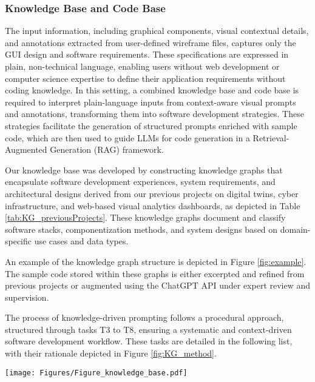 \begin{description}
\subsubsection{Knowledge Base and Code Base}
\label{subsec:KB_CB}
The input information, including graphical components, visual contextual details, and annotations extracted from user-defined wireframe files, captures only the GUI design and software requirements. These specifications are expressed in plain, non-technical language, enabling users without web development or computer science expertise to define their application requirements without coding knowledge. In this setting, a combined knowledge base and code base is required to interpret plain-language inputs from context-aware visual prompts and annotations, transforming them into software development strategies. These strategies facilitate the generation of structured prompts enriched with sample code, which are then used to guide LLMs for code generation in a Retrieval-Augmented Generation (RAG) framework. 

Our knowledge base was developed by constructing knowledge graphs that encapsulate software development experiences, system requirements, and architectural designs derived from our previous projects on digital twins, cyber infrastructure, and web-based visual analytics dashboards, as depicted in Table \ref{tab:KG_previousProjects}. These knowledge graphs document and classify software stacks, componentization methods, and system designs based on domain-specific use cases and data types. 



An example of the knowledge graph structure is depicted in Figure \ref{fig:example}. The sample code stored within these graphs is either excerpted and refined from previous projects or augmented using the ChatGPT API under expert review and supervision.

The process of knowledge-driven prompting follows a procedural approach, structured through tasks T3 to T8, ensuring a systematic and context-driven software development workflow. These tasks are detailed in the following list, with their rationale depicted in Figure \ref{fig:KG_method}. 

\begin{figure*}[htbp]
 \centering
\texttt{[image: Figures/Figure\_knowledge\_base.pdf]}
 \caption{Structured knowledge representations for translating plain-language annotations from UI wireframes into structured prompts using technical language. }
 \label{fig:KG_method}
\end{figure*}


\end{description}
